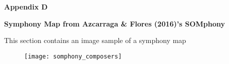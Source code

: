 %
%
%                 

\textbf{\Huge Appendix D}
\bigskip

\textbf{\LARGE Symphony Map from Azcarraga \& Flores (2016)'s SOMphony}

\bigskip
This section contains an image sample of a symphony map

\begin{figure}[h]
\centering
\texttt{[image: somphony\_composers]}
\end{figure}

